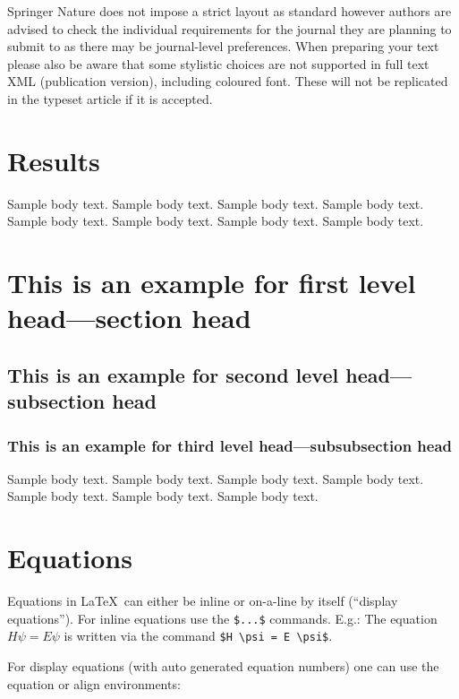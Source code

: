 \documentclass[sn-vancouver,Numbered,pdflatex]{sn-jnl}
\theoremstyle{remark}
\theoremstyle{definition}
\begin{document}
Springer Nature does not impose a strict layout as standard however
authors are advised to check the individual requirements for the journal
they are planning to submit to as there may be journal-level
preferences. When preparing your text please also be aware that some
stylistic choices are not supported in full text XML (publication
version), including coloured font. These will not be replicated in the
typeset article if it is accepted.

\hypertarget{sec2}{%
\section{Results}\label{sec2}}

Sample body text. Sample body text. Sample body text. Sample body text.
Sample body text. Sample body text. Sample body text. Sample body text.

\hypertarget{sec3}{%
\section{This is an example for first level head---section
head}\label{sec3}}

\hypertarget{subsec2}{%
\subsection{This is an example for second level head---subsection
head}\label{subsec2}}

\hypertarget{subsubsec2}{%
\subsubsection{This is an example for third level head---subsubsection
head}\label{subsubsec2}}

Sample body text. Sample body text. Sample body text. Sample body text.
Sample body text. Sample body text. Sample body text.

\hypertarget{sec4}{%
\section{Equations}\label{sec4}}

Equations in \LaTeX~can either be inline or on-a-line by itself
(``display equations''). For inline equations use the \texttt{\$...\$}
commands. E.g.: The equation \(H\psi = E \psi\) is written via the
command \texttt{\$H\ \textbackslash{}psi\ =\ E\ \textbackslash{}psi\$}.

For display equations (with auto generated equation numbers) one can use
the equation or align environments:
\end{document}
